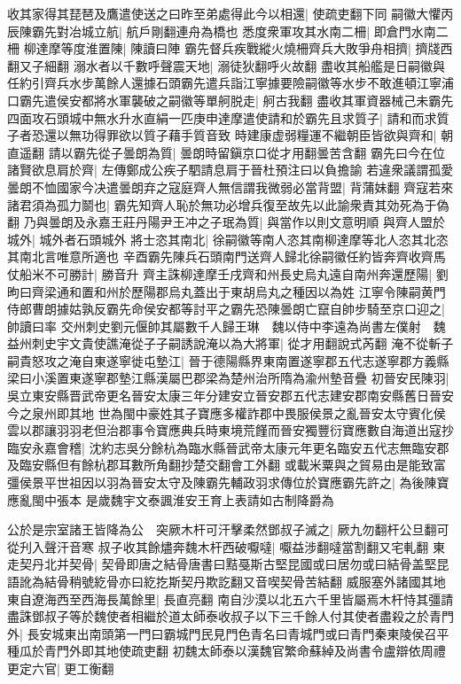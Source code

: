 收其家得其琵琶及鷹遣使送之曰昨至弟處得此今以相還|{
	使疏吏翻下同}
嗣徽大懼丙辰陳霸先對冶城立航|{
	航戶剛翻連舟為橋也}
悉度衆軍攻其水南二柵|{
	即倉門水南二柵}
柳達摩等度淮置陳|{
	陳讀曰陣}
霸先督兵疾戰縱火燒柵齊兵大敗爭舟相擠|{
	擠牋西翻又子細翻}
溺水者以千數呼聲震天地|{
	溺徒狄翻呼火故翻}
盡收其船艦是日嗣徽與任約引齊兵水步萬餘人還據石頭霸先遣兵詣江寧據要險嗣徽等水步不敢進頓江寧浦口霸先遣侯安都將水軍襲破之嗣徽等單舸脱走|{
	舸古我翻}
盡收其軍資器械己未霸先四面攻石頭城中無水升水直絹一匹庚申達摩遣使請和於霸先且求質子|{
	請和而求質子者恐還以無功得罪欲以質子藉手質音致}
時建康虚弱糧運不繼朝臣皆欲與齊和|{
	朝直遥翻}
請以霸先從子曇朗為質|{
	曇朗時留鎭京口從才用翻曇苦含翻}
霸先曰今在位諸賢欲息肩於齊|{
	左傳鄭成公疾子駟請息肩于晉杜預注曰以負擔諭}
若違衆議謂孤愛曇朗不恤國家今决遣曇朗弃之寇庭齊人無信謂我微弱必當背盟|{
	背蒲妹翻}
齊寇若來諸君須為孤力鬬也|{
	霸先知齊人恥於無功必增兵復至故先以此諭衆責其効死為于偽翻}
乃與曇朗及永嘉王莊丹陽尹王冲之子珉為質|{
	與當作以則文意明順}
與齊人盟於城外|{
	城外者石頭城外}
將士恣其南北|{
	徐嗣徽等南人恣其南柳達摩等北人恣其北恣其南北言唯意所適也}
辛酉霸先陳兵石頭南門送齊人歸北徐嗣徽任約皆奔齊收齊馬仗船米不可勝計|{
	勝音升}
齊主誅柳達摩壬戌齊和州長史烏丸遠自南州奔還歷陽|{
	劉昫曰齊梁通和置和州於歷陽郡烏丸蓋出于東胡烏丸之種因以為姓}
江寧令陳嗣黄門侍郎曹朗據姑孰反霸先命侯安都等討平之霸先恐陳曇朗亡竄自帥步騎至京口迎之|{
	帥讀曰率}
交州刺史劉元偃帥其屬數千人歸王琳　魏以侍中李遠為尚書左僕射　魏益州刺史宇文貴使譙淹從子子嗣誘說淹以為大將軍|{
	從才用翻說式芮翻}
淹不從斬子嗣貴怒攻之淹自東遂寧徙屯墊江|{
	晉于德陽縣界東南置遂寧郡五代志遂寧郡方義縣梁曰小溪置東遂寧郡墊江縣漢屬巴郡梁為楚州治所隋為渝州墊音疊}
初晉安民陳羽|{
	吳立東安縣晋武帝更名晉安太康三年分建安立晉安郡五代志建安郡南安縣舊日晉安今之泉州即其地}
世為閩中豪姓其子寶應多權詐郡中畏服侯景之亂晉安太守賓化侯雲以郡讓羽羽老但治郡事令寶應典兵時東境荒饉而晉安獨豐衍寶應數自海道出寇抄臨安永嘉會稽|{
	沈約志吳分餘杭為臨水縣晉武帝太康元年更名臨安五代志無臨安郡及臨安縣但有餘杭郡耳數所角翻抄楚交翻會工外翻}
或載米粟與之貿易由是能致富彊侯景平世祖因以羽為晉安太守及陳霸先輔政羽求傳位於寶應霸先許之|{
	為後陳寶應亂閩中張本}
是歲魏宇文泰諷淮安王育上表請如古制降爵為

公於是宗室諸王皆降為公　突厥木杆可汗擊柔然鄧叔子滅之|{
	厥九勿翻杆公旦翻可從刋入聲汗音寒}
叔子收其餘燼奔魏木杆西破嚈噠|{
	嚈益涉翻噠當割翻又宅軋翻}
東走契丹北并契骨|{
	契骨即唐之結骨唐書曰黠戞斯古堅昆國或曰居勿或曰結骨盖堅昆語訛為結骨稍號紇骨亦曰紇扢斯契丹欺訖翻又音喫契骨苦結翻}
威服塞外諸國其地東自遼海西至西海長萬餘里|{
	長直亮翻}
南自沙漠以北五六千里皆屬焉木杆恃其彊請盡誅鄧叔子等於魏使者相繼於道太師泰收叔子以下三千餘人付其使者盡殺之於青門外|{
	長安城東出南頭第一門曰霸城門民見門色青名曰青城門或曰青門秦東陵侯召平種瓜於青門外即其地使疏吏翻}
初魏太師泰以漢魏官繁命蘇綽及尚書令盧辯依周禮更定六官|{
	更工衡翻}


